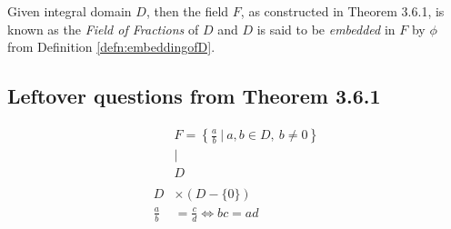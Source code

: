 \begin{definition}
Given integral domain $D$, then the field $F$, as constructed in Theorem 3.6.1, is known as the \textit{Field of Fractions} of $D$ and $D$ is said to be \textit{embedded} in $F$ by $\phi$ from Definition \ref{defn:embeddingofD}.
\end{definition}
\newpage
\subsection{Leftover questions from Theorem 3.6.1} 

\begin{align}
    &F = \left\{\frac{a}{b} \ | \ a,b\in D, \  b\neq 0 \right\} \nonumber \\
    &\vert \nonumber \\ 
    &D \nonumber \\
    & \nonumber \\
    D &\times (D-\{ 0 \}) \nonumber \\
    \frac{a}{b} &= \frac{c}{d} \iff bc=ad \nonumber
\end{align}


